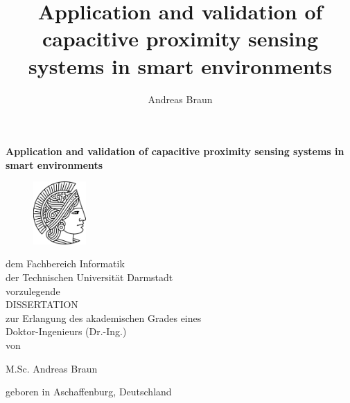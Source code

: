 \title{Application and validation of capacitive proximity sensing systems in smart environments}%
\author{Andreas Braun}


\begin{titlepage}

\begin{center}

\vspace*{1.0cm}
\huge {\bf Application and validation of capacitive proximity sensing systems in smart environments}
\vfill

\begin{figure}[ht]
    \centering
        \includegraphics[width=2cm]{athene.pdf}
\end{figure}

\vspace*{0.2cm}

\normalsize

dem Fachbereich Informatik \\
der Technischen Universität Darmstadt \\
vorzulegende \\

\vspace*{0.5cm}
\Large{\scshape DISSERTATION} \\
\vspace*{0.5cm}
\normalsize
zur Erlangung des akademischen Grades eines \\
Doktor-Ingenieurs (Dr.-Ing.) \\
von \\

\vspace*{0.3cm}

\Large { M.Sc. Andreas Braun\\}

{\normalsize geboren in Aschaffenburg, Deutschland } %

\normalsize
\vspace*{0.2cm}
\vfill


\end{center}
\end{titlepage}
